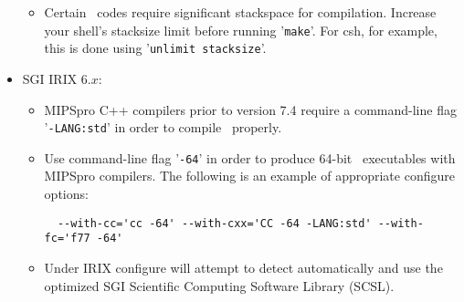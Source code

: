 \documentclass[12pt]{article}
\begin{document}
\begin{itemize}
\begin{itemize}
   \item Certain \PSIthree\ codes require significant stackspace for compilation.
   Increase your shell's stacksize limit before running '{\tt make}'.  For csh,
   for example, this is done using '{\tt unlimit stacksize}'.
  \end{itemize}

\item SGI IRIX 6.$x$:
  \begin{itemize}
   \item MIPSpro C++ compilers prior to version 7.4 require a command-line flag
   '{\tt -LANG:std}' in order to compile \PSIthree\ properly.

   \item Use command-line flag '{\tt -64}' in order to produce 64-bit \PSIthree\ executables with
   MIPSpro compilers. The following is an example of appropriate configure options:
   \begin{verbatim}
  --with-cc='cc -64' --with-cxx='CC -64 -LANG:std' --with-fc='f77 -64'
   \end{verbatim}

   \item Under IRIX configure will attempt to detect automatically and use
   the optimized SGI Scientific Computing Software Library (SCSL).
  \end{itemize}

\end{itemize}
\end{document}
